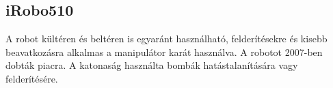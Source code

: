\renewcommand{\xname}{iRobo510}
\renewcommand{\x}{0.521}
\renewcommand{\y}{0.686}
\renewcommand{\z}{0.178}
\renewcommand{\weight}{20}
\renewcommand{\img}{MobilisRobotok/iRobo/iRobo510.jpg}
\renewcommand{\sources}{Forrás: https://www.army-technology.com}
\renewcommand{\captionn}{iRobo 510 lánctalpas packboot}
\renewcommand{\watherProf}{Igen -3m ig.}
\renewcommand{\sebesseg}{9.3}
\renewcommand{\weight}{10.89}
\renewcommand{\AcAndGy}{Igen}
\renewcommand{\GPS}{Igen}
\subsection*{iRobo510}
 A robot kültéren és beltéren is egyaránt használható, felderítésekre és kisebb beavatkozásra alkalmas a manipulátor karát használva. A robotot 2007-ben dobták piacra. A katonaság használta bombák hatástalanítására vagy felderítésére. 

\renewcommand{\aspectratioPic}{0.5}



